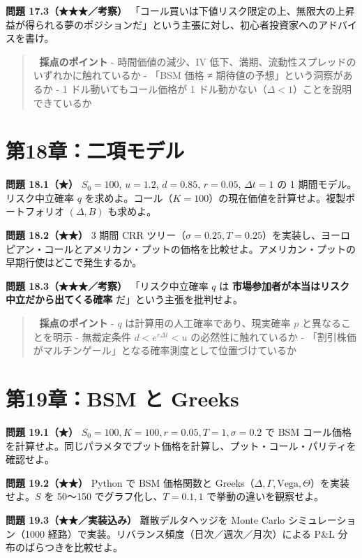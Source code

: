 \documentclass[11pt,a4paper]{report}
\begin{document}
\textbf{問題 17.3（★★★／考察）} 「コール買いは下値リスク限定の上、無限大の上昇益が得られる夢のポジションだ」という主張に対し、初心者投資家へのアドバイスを書け。

\begin{quote}
📝 \textbf{採点のポイント}
- 時間価値の減少、IV 低下、満期、流動性スプレッドのいずれかに触れているか
- 「BSM 価格 ≠ 期待値の予想」という洞察があるか
- 1 ドル動いてもコール価格が 1 ドル動かない（$\Delta < 1$）ことを説明できているか
\end{quote}

\section{第18章：二項モデル}

\textbf{問題 18.1（★）} $S_0 = 100$, $u = 1.2$, $d = 0.85$, $r = 0.05$, $\Delta t = 1$ の 1 期間モデル。リスク中立確率 $q$ を求めよ。コール（$K = 100$）の現在価値を計算せよ。複製ポートフォリオ $(\Delta, B)$ も求めよ。

\textbf{問題 18.2（★★）} 3 期間 CRR ツリー（$\sigma = 0.25, T = 0.25$）を実装し、ヨーロピアン・コールとアメリカン・プットの価格を比較せよ。アメリカン・プットの早期行使はどこで発生するか。

\textbf{問題 18.3（★★★／考察）} 「リスク中立確率 $q$ は \textbf{市場参加者が本当はリスク中立だから出てくる確率} だ」という主張を批判せよ。

\begin{quote}
📝 \textbf{採点のポイント}
- $q$ は計算用の人工確率であり、現実確率 $p$ と異なることを明示
- 無裁定条件 $d < e^{r\Delta t} < u$ の必然性に触れているか
- 「割引株価がマルチンゲール」となる確率測度として位置づけているか
\end{quote}

\section{第19章：BSM と Greeks}

\textbf{問題 19.1（★）} $S_0 = 100, K = 100, r = 0.05, T = 1, \sigma = 0.2$ で BSM コール価格を計算せよ。同じパラメタでプット価格を計算し、プット・コール・パリティを確認せよ。

\textbf{問題 19.2（★★）} Python で BSM 価格関数と Greeks（$\Delta, \Gamma, \mathrm{Vega}, \Theta$）を実装せよ。$S$ を 50〜150 でグラフ化し、$T = 0.1, 1$ で挙動の違いを観察せよ。

\textbf{問題 19.3（★★／実装込み）} 離散デルタヘッジを Monte Carlo シミュレーション（1000 経路）で実装。リバランス頻度（日次／週次／月次）による P\&L 分布のばらつきを比較せよ。
\end{document}
